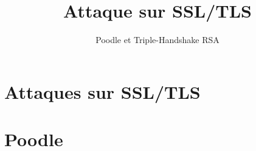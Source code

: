 \documentclass[a4paper,openany]{memoir}
\title{Attaque sur SSL/TLS}
\subtitle{Poodle et Triple-Handshake RSA}
\begin{document}
\frontmatter%
\maketitle
 \thispagestyle{empty}

 

 \cleardoublepage
\tableofcontents*

\mainmatter%





\part{Attaques sur SSL/TLS}























\part{Poodle}
\label{part:poodle}





 


\end{document}

